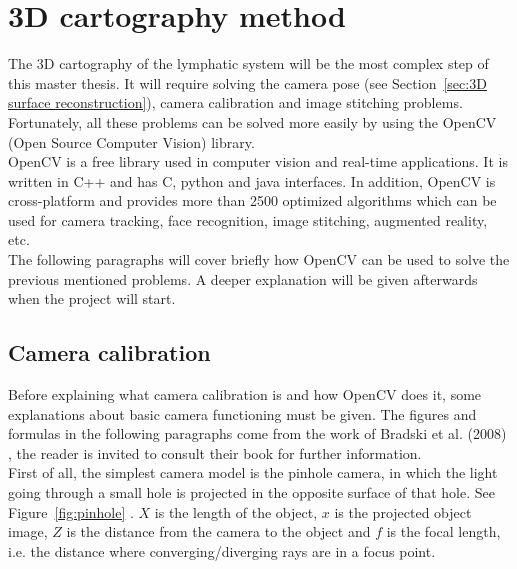 \section{3D cartography method}
\label{sec:3D cartography method}

The 3D cartography of the lymphatic system will be the most complex step of this master thesis. It will require solving the camera pose (see Section~\ref{sec:3D surface reconstruction}), camera calibration and image stitching problems. Fortunately, all these problems can be solved more easily by using the OpenCV (Open Source Computer Vision) library. \\

OpenCV is a free library used in computer vision and real-time applications. It is written in C++ and has C, python and java interfaces. In addition, OpenCV is cross-platform and provides more than 2500 optimized algorithms \cite{opencv} which can be used for camera tracking, face recognition, image stitching, augmented reality, etc.  \\

The following paragraphs will cover briefly how OpenCV can be used to solve the previous mentioned problems. A deeper explanation will be given afterwards when the project will start. \\

\subsection{Camera calibration}
\label{sec:camera calibration}

Before explaining what camera calibration is and how OpenCV does it, some explanations about basic camera functioning must be given. The figures and formulas in the following paragraphs come from the work of Bradski et al. (2008) \cite{bradski_learning_2008}, the reader is invited to consult their book for further information.\\

First of all, the simplest camera model is the pinhole camera, in which the light going through a small hole is projected in the opposite surface of that hole. See Figure~\ref{fig:pinhole} \cite[p. 372]{bradski_learning_2008}. $X$ is the length of the object, $x$ is the projected object image, $Z$ is the distance from the camera to the object and $f$ is the focal length, i.e. the distance where converging/diverging rays are in a focus point.\\

